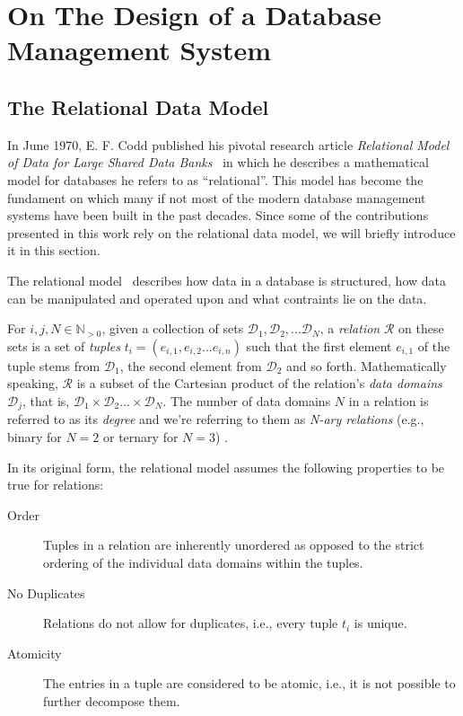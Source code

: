 \chapter{On The Design of a Database Management System}
\label{chapter:theory_databases}


\section{The Relational Data Model}
\label{section:relational_data_model}

In June 1970, E. F. Codd published his pivotal research article \emph{Relational Model of Data for Large Shared Data Banks}~\cite{Codd:1970Relational} in which he describes a mathematical model for databases he refers to as ``relational''. This model has become the fundament on which many if not most of the modern database management systems have been built in the past decades. Since some of the contributions presented in this work rely on the relational data model, we will briefly introduce it in this section.

The relational model~\cite{Codd:1970Relational,Codd:1990Relational} describes how data in a database is structured, how data can be manipulated and operated upon and what contraints lie on the data. 


For $i,j,N \in \mathbb{N}_{> 0}$, given a collection of sets $\mathcal{D}_1, \mathcal{D}_2, ... \mathcal{D}_N$, a \emph{relation} $\mathcal{R}$ on these sets is a set of \emph{tuples} $t_i = (e_{i,1}, e_{i,2} ... e_{i,n})$ such that the first element $e_{i,1}$ of the tuple stems from $\mathcal{D}_1$, the second element from $\mathcal{D}_2$ and so forth. Mathematically speaking, $\mathcal{R}$ is a subset of the Cartesian product of the relation's \emph{data domains} $\mathcal{D}_j$, that is, $\mathcal{D}_1 \times \mathcal{D}_2 ... \times \mathcal{D}_N$. The number of data domains $N$ in a relation is referred to as its \emph{degree} and we're referring to them as \emph{N-ary relations} (e.g., binary for $N=2$ or ternary for $N=3$) .

In its original form, the relational model assumes the following properties to be true for relations:

\begin{description}
    \item[Order] Tuples in a relation are inherently unordered as opposed to the strict ordering of the individual data domains within the tuples.
    \item[No Duplicates] Relations do not allow for duplicates, i.e., every tuple $t_i$ is unique.
    \item[Atomicity] The entries in a tuple are considered to be atomic, i.e., it is not possible to further decompose them.
\end{description}


